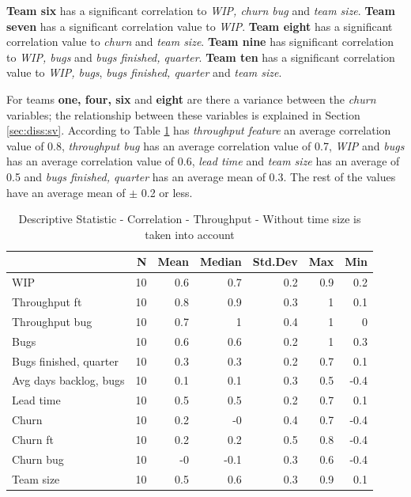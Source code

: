 \documentclass[UKenglish]{ifimaster}  %
\begin{document}
\textbf{Team six} has a significant correlation to \textit{WIP, churn bug} and \textit{team size}. \textbf{Team seven} has a significant correlation value to \textit{WIP}. \textbf{Team eight} has a significant correlation value to \textit{churn} and \textit{team size}. \textbf{Team nine} has significant correlation to \textit{WIP, bugs} and \textit{bugs finished, quarter}. \textbf{Team ten} has a significant correlation value to \textit{WIP, bugs}, \textit{bugs finished, quarter} and \textit{team size}. 


For teams \textbf{one, four, six} and \textbf{eight} are there a variance between the \textit{churn} variables; the relationship between these variables is explained in Section \ref{sec:diss:sv}.
According to Table \ref{DS:corr:TP} has \textit{throughput feature} an average correlation value of 0.8, \textit{throughput bug} has an average correlation value of 0.7, \textit{WIP} and \textit{bugs} has an average correlation value of 0.6, \textit{lead time} and \textit{team size} has an average of 0.5 and \textit{bugs finished, quarter} has an average mean of 0.3. The rest of the values have an average mean of $\pm$ 0.2 or less.
\begin{table}[!htbp]
 \centering
 \begin{tabular}{ | l | r | r | r | r | r | r | }
 \hline
& \bf{N} & \bf{Mean} & \bf{Median} & \bf{Std.Dev} & \bf{Max} & \bf{Min} \\ \hline
WIP  & 10 & 0.6 & 0.7 & 0.2 & 0.9 & 0.2\\ \hline
Throughput ft  & 10 & 0.8 & 0.9 & 0.3 & 1 & 0.1\\ \hline
Throughput bug  & 10 & 0.7 & 1 & 0.4 & 1 & 0\\ \hline
Bugs  & 10 & 0.6 & 0.6 & 0.2 & 1 & 0.3\\ \hline
Bugs finished, quarter  & 10 & 0.3 & 0.3 & 0.2 & 0.7 & 0.1\\ \hline
Avg days backlog, bugs  & 10 & 0.1 & 0.1 & 0.3 & 0.5 & -0.4\\ \hline
Lead time & 10 & 0.5 & 0.5 & 0.2 & 0.7 & 0.1\\ \hline
Churn  & 10 & 0.2 & -0 & 0.4 & 0.7 & -0.4\\ \hline
Churn ft  & 10 & 0.2 & 0.2 & 0.5 & 0.8 & -0.4\\ \hline
Churn bug  & 10 & -0 & -0.1 & 0.3 & 0.6 & -0.4\\ \hline
Team size  & 10 & 0.5 & 0.6 & 0.3 & 0.9 & 0.1\\ \hline
\end{tabular}
 \caption{Descriptive Statistic - Correlation - Throughput - Without time size is taken into account}
 \label{DS:corr:TP}
 \end{table}
 \newpage
 
\end{document}
